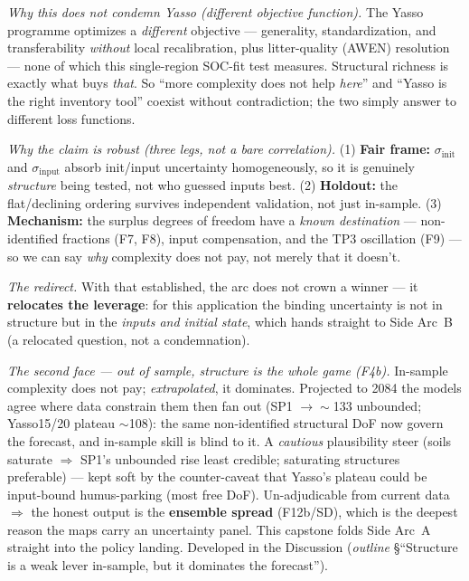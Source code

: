 \documentclass[10pt]{article}
\newcommand{\sinit}{\sigma_{\mathrm{init}}}
\newcommand{\sinput}{\sigma_{\mathrm{input}}}
\begin{document}
\emph{Why this does not condemn Yasso (different objective function).} The Yasso programme optimizes a
\emph{different} objective --- generality, standardization, and transferability \emph{without} local
recalibration, plus litter-quality (AWEN) resolution --- none of which this single-region SOC-fit test
measures. Structural richness is exactly what buys \emph{that}. So ``more complexity does not help
\emph{here}'' and ``Yasso is the right inventory tool'' coexist without contradiction; the two simply
answer to different loss functions.

\emph{Why the claim is robust (three legs, not a bare correlation).} (1) \textbf{Fair frame:} $\sinit$
and $\sinput$ absorb init/input uncertainty homogeneously, so it is genuinely \emph{structure} being
tested, not who guessed inputs best. (2) \textbf{Holdout:} the flat/declining ordering survives
independent validation, not just in-sample. (3) \textbf{Mechanism:} the surplus degrees of freedom have
a \emph{known destination} --- non-identified fractions (F7, F8), input compensation, and the TP3
oscillation (F9) --- so we can say \emph{why} complexity does not pay, not merely that it doesn't.

\emph{The redirect.} With that established, the arc does not crown a winner --- it \textbf{relocates the
leverage}: for this application the binding uncertainty is not in structure but in the \emph{inputs and
initial state}, which hands straight to Side Arc~B (a relocated question, not a condemnation).

\emph{The second face --- out of sample, structure is the whole game (F4b).} In-sample complexity does
not pay; \emph{extrapolated}, it dominates. Projected to 2084 the models agree where data constrain them
then fan out (SP1 $\to\sim$133 unbounded; Yasso15/20 plateau $\sim$108): the same non-identified structural
DoF now govern the forecast, and in-sample skill is blind to it. A \emph{cautious} plausibility steer
(soils saturate $\Rightarrow$ SP1's unbounded rise least credible; saturating structures preferable) ---
kept soft by the counter-caveat that Yasso's plateau could be input-bound humus-parking (most free DoF).
Un-adjudicable from current data $\Rightarrow$ the honest output is the \textbf{ensemble spread} (F12b/SD),
which is the deepest reason the maps carry an uncertainty panel. This capstone folds Side Arc~A straight
into the policy landing. Developed in the Discussion (\emph{outline} \S``Structure is a weak lever
in-sample, but it dominates the forecast'').
\end{document}
